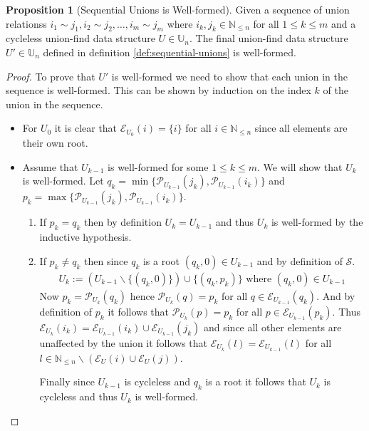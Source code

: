 \documentclass[a4paper,12pt]{article}
\theoremstyle{definition}
\newtheorem{proposition}{Proposition}[section]
\begin{document}
\begin{proposition}[Sequential Unions is Well-formed]
    Given a sequence of union relationss $i_1 \sim j_1, i_2 \sim j_2, \ldots,
    i_m \sim j_m$ where $i_k, j_k \in \mathbb{N}_{\leq n}$ for all $1 \leq k
    \leq m$ and a cycleless union-find data structure $U \in \mathbb{U}_n$. The
    final union-find data structure $U' \in \mathbb{U}_n$ defined in definition
    \ref{def:sequential-unions} is well-formed.
\end{proposition}
\begin{proof}
    To prove that $U'$ is well-formed we need to show that each union in the
    sequence is well-formed. This can be shown by induction on the index $k$ of
    the union in the sequence.
    \begin{itemize}
        \item For $U_0$ it is clear that $\mathcal{E}_{U_0}(i) = \{i\}$ for all $i \in
        \mathbb{N}_{\leq n}$ since all elements are their own root.
        \item Assume that $U_{k-1}$ is well-formed for some $1 \leq k \leq m$.
        We will show that $U_k$ is well-formed. Let $q_k = \min
        \{\mathcal{P}_{U_{k-1}}(j_k), \mathcal{P}_{U_{k-1}}(i_k)\}$ and $p_k =
        \max \{\mathcal{P}_{U_{k-1}}(j_k), \mathcal{P}_{U_{k-1}}(i_k)\}$.
        \begin{enumerate}
            \item If $p_k = q_k$ then by definition $U_k = U_{k-1}$ and thus
            $U_k$ is well-formed by the inductive hypothesis.
            \item If $p_k \neq q_k$ then since $q_k$ is a root $(q_k, 0) \in U_{k - 1}$ and by definition
            of $\mathcal{S}$.
            \begin{align*}
                U_k := (U_{k-1} \backslash \{(q_k, 0)\}) \cup \{(q_k, p_k)\} \text{ where } (q_k, 0) \in U_{k-1}
            \end{align*}
            Now $p_k = \mathcal{P}_{U_k}(q_k)$ hence $\mathcal{P}_{U_k}(q) = p_k$ for all $q
            \in \mathcal{E}_{U_{k - 1}}(q_k)$. And by definition of $p_k$ it
            follows that $\mathcal{P}_{U_k}(p) = p_k$ for all $p \in
            \mathcal{E}_{U_{k - 1}}(p_k)$. Thus $\mathcal{E}_{U_k}(i_k) =
            \mathcal{E}_{U_{k - 1}}(i_k) \cup \mathcal{E}_{U_{k - 1}}(j_k)$ and
            since all other elements are unaffected by the union it follows that
            $\mathcal{E}_{U_k}(l) = \mathcal{E}_{U_{k - 1}}(l)$ for all $l \in
            \mathbb{N}_{\leq n} \backslash (\mathcal{E}_U(i) \cup
            \mathcal{E}_U(j))$.

            Finally since $U_{k-1}$ is cycleless and $q_k$ is a root it follows
            that $U_k$ is cycleless and thus $U_k$ is well-formed.
        \end{enumerate}
    \end{itemize}
\end{proof}
\end{document}
